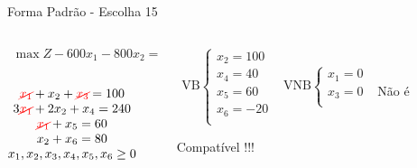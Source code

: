 \begin{frame}
{\begin{block}{Forma Padrão - {\color{cyan}Escolha 15}}
			\begin{columns}
				\begin{column}{0.35\textwidth}
					$
						\begin{matrix}
							\max Z - 600x_1 - 800x_2 = 0 \\
						\end{matrix}
					$ \\
					 \\
					$
						\begin{matrix}
							{\color{red}\cancel{x_1}}  + x_2  + {\color{red}\cancel{x_3}}                   = 100 \\
							3{\color{red}\cancel{x_1}} + 2x_2       + x_4             = 240 \\
							{\color{red}\cancel{x_1}}                    + x_5       = 60 \\
							x_2                           + x_6 = 80 \\
							x_1,x_2, x_3, x_4, x_5, x_6 \ge 0 \\
						\end{matrix}
					$
				\end{column}
				\vline
				\hspace{0.1cm}
				\begin{column}{0.45\textwidth}
						$
							\begin{matrix}
								\text{VB} \left\{  \begin{matrix}
																 x_2 = 100 \\
																 x_4 = 40 \\
																 x_5 = 60 \\
																 x_6 = -20 \\
												   \end{matrix} 
										   \right.
								&
								\text{VNB} \left\{  \begin{matrix}
																 x_1 = 0 \\
																 x_3 = 0 \\
												   \end{matrix} 
										   \right. 
								\\
							 & \\
							\end{matrix}
						$
						{\color{red}Não é Compatível !!!}
				\end{column}
			\end{columns}
		\end{block}
	}
\end{frame}

